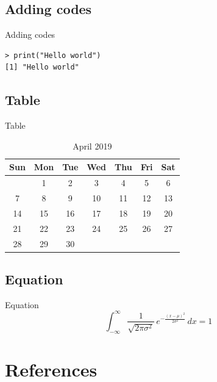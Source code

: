 \documentclass[aspectratio=43,11pt]{beamer}
\begin{document}
\subsection{Adding codes}
\begin{frame}[fragile]{Adding codes}
  \begin{Verbatim}
> print("Hello world")
[1] "Hello world"
  \end{Verbatim}
\end{frame}

\subsection{Table}
\begin{frame}{Table}
  \begin{table}
    \centering
    \caption{April 2019}
    \begin{tabular}{|c|c|c|c|c|c|c|}
      \hline
      Sun & Mon & Tue & Wed & Thu & Fri & Sat \\ \hline
          & 1  & 2  & 3  & 4  & 5  & 6  \\ \hline
      7   & 8  & 9  & 10 & 11 & 12 & 13 \\ \hline
      14  & 15 & 16 & 17 & 18 & 19 & 20 \\ \hline
      21  & 22 & 23 & 24 & 25 & 26 & 27 \\ \hline
      28  & 29 & 30 &    &    &    &    \\ \hline
    \end{tabular}
  \end{table}
\end{frame}

\subsection{Equation}
\begin{frame}{Equation}
  \[
    \int_{-\infty}^{\infty}\frac{1}{\sqrt{2\pi\sigma^{2}}}\,
      e^{-\frac{(x-\mu)^{2}}{2\sigma^{2}}}\,dx = 1
  \]
\end{frame}

\section{References}
\end{document}
